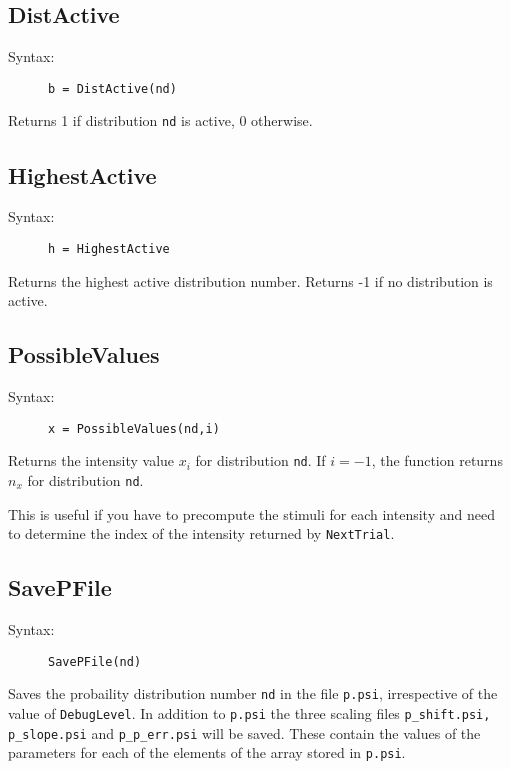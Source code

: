 \documentclass[10pt,letterpaper]{article}
\begin{document}
\subsection{DistActive}

\begin{description}
\item[Syntax:] {\tt b = DistActive(nd)}
\end{description}

Returns 1 if distribution {\tt nd} is active, 0 otherwise.

\subsection{HighestActive}

\begin{description}
\item[Syntax:] {\tt h = HighestActive}
\end{description}

Returns the highest active distribution number. Returns -1 if no distribution is active.

\subsection{PossibleValues}

\begin{description}
\item[Syntax:] {\tt x = PossibleValues(nd,i)}
\end{description}

Returns the intensity value $x_i$ for distribution {\tt nd}. If $i=-1$, the 
function returns $n_x$ for distribution {\tt nd}.

This is useful if you have to precompute the stimuli for each intensity and need to
determine the index of the intensity returned by {\tt NextTrial}.

\subsection{SavePFile}

\begin{description}
\item[Syntax:] {\tt SavePFile(nd)}
\end{description}

Saves the probaility distribution number {\tt nd} in the file {\tt p.psi}, 
irrespective of the value of {\tt DebugLevel}. In addition to {\tt p.psi} the 
three scaling files {\tt p\_shift.psi, p\_slope.psi} and {\tt p\_p\_err.psi} will be 
saved. These contain the values of the parameters for each of the elements of 
the array stored in {\tt p.psi}.
\end{document}
